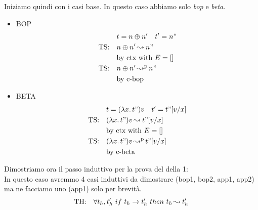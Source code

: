\documentclass{article}
\newcommand{\bop}[0]{\ensuremath\oplus}
\begin{document}
Iniziamo quindi con i casi base. In questo caso abbiamo solo \textit{bop} e \textit{beta}.
\begin{itemize}
    \item BOP 
        \begin{align*}
            \quad & t = n\bop n'\quad t'=n" \\
            \text{TS:}  \quad & n\bop n' \cred n" \\
            \quad & \text{by ctx with } E = [] \\
            \text {TS:} \quad & n\bop n'\credp n" \\
            \quad & \text{by c-bop}
        \end{align*}
    \item BETA
        \begin{align*}
            \quad & t = (\lambda x\ldotp t")v\quad t'=t"[v/x] \\
            \text{TS:}  \quad & (\lambda x\ldotp t")v \operatorname{ \leadsto^{} } t"[v/x] \\
            \quad & \text{by ctx with } E = [] \\
            \text {TS:} \quad & (\lambda x\ldotp t")v \operatorname{ \leadsto^{p} } t"[v/x] \\
            \quad & \text{by c-beta}
        \end{align*}
\end{itemize}
Dimostriamo ora il passo induttivo per la prova del della 1: \\
In questo caso avremmo 4 casi induttivi da dimostrare (bop1, bop2, app1, app2) ma ne facciamo uno (app1) solo per brevità.
\[
    \text{TH:} \quad \forall t_h,t_h'\ if\ t_h\to t_h'\ then\ t_h\operatorname{ \leadsto^{} } t_h' \\
\]
\end{document}
